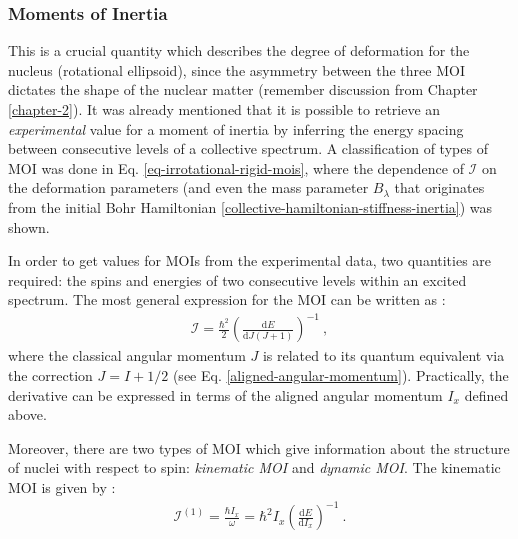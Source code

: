 \subsubsection{Moments of Inertia}

This is a crucial quantity which describes the degree of deformation for the nucleus (rotational ellipsoid), since the asymmetry between the three MOI dictates the shape of the nuclear matter (remember discussion from Chapter \ref{chapter-2}). It was already mentioned that it is possible to retrieve an \emph{experimental} value for a moment of inertia by inferring the energy spacing between consecutive levels of a collective spectrum. A classification of types of MOI was done in Eq. \ref{eq-irrotational-rigid-mois}, where the dependence of $\mathcal{I}$ on the deformation parameters (and even the mass parameter $B_\lambda$ that originates from the initial Bohr Hamiltonian \ref{collective-hamiltonian-stiffness-inertia}) was shown.

In order to get values for MOIs from the experimental data, two quantities are required: the spins and energies of two consecutive levels within an excited spectrum. The most general expression for the MOI can be written as \cite{ahmad2021backbending}:
\begin{align}
    \mathcal{I}=\frac{\hbar^2}{2}\left(\frac{\text{d}E}{\text{d}J(J+1)}\right)^{-1}\ ,
\end{align}
where the classical angular momentum $J$ is related to its quantum equivalent via the correction $J=I+1/2$ (see Eq. \ref{aligned-angular-momentum}). Practically, the derivative can be expressed in terms of the aligned angular momentum $I_x$ defined above.

Moreover, there are two types of MOI which give information about the structure of nuclei with respect to spin: \emph{kinematic MOI} and \emph{dynamic MOI}. The kinematic MOI is given by \cite{wu1992relation}:
\begin{align}
    \mathcal{I}^{(1)}=\frac{\hbar I_x}{\omega}=\hbar^2 I_x\left(\frac{\text{d}E}{\text{d}I_x}\right)^{-1}\ .
    \label{kinematic-moi-general}
\end{align}

